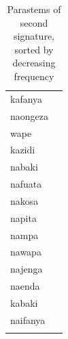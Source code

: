\documentclass[output=paper,colorlinks,citecolor=brown]{langscibook}
\begin{document}
\begin{table}
\begin{minipage}[t]{.24\textwidth}
\begin{tabular}{ll}
kafanya \\ 
naongeza \\ 
wape \\ 
kazidi \\ 
nabaki \\ 
nafuata \\ 
nakosa \\ 
napita \\ 
nampa \\ 
nawapa \\ 
najenga \\ 
naenda \\ 
kabaki \\ 
naifanya \\  
\lspbottomrule
 \end{tabular}
 \end{minipage}
 \caption{Parastems of second signature, sorted by decreasing frequency}
 \label{2ndsignatureparastems}
 \end{table}
 
\end{document}
